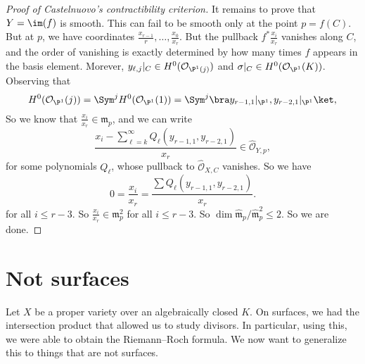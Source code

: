 \documentclass[a4paper]{article}
\begin{document}
\begin{proof}[Proof of Castelnuovo's contractibility criterion]
  It remains to prove that $Y = \im (f)$ is smooth. This can fail to be smooth only at the point $p = f(C)$. But at $p$, we have coordinates $\frac{x_{r - 1}}{r}, \ldots, \frac{x_0}{x_r}$. But the pullback $f^* \frac{x_i}{x_r}$ vanishes along $C$, and the order of vanishing is exactly determined by how many times $f$ appears in the basis element. Morever, $y_{\ell, j}|_C \in H^0(\mathcal{O}_{\P^1(j)})$ and $\sigma|_C \in H^0(\mathcal{O}_{\P^1}(K))$. Observing that
  \[
    H^0(\mathcal{O}_{\P^1}(j)) = \Sym^j H^0(\mathcal{O}_{\P^1}(1)) = \Sym^j \bra y_{r - 1, 1}|_{\P^1}, y_{r - 2, 1}|_{\P^1} \ket,
  \]
  So we know that $\frac{x_i}{x_r} \in \mathfrak{m}_p$, and we can write
  \[
    \frac{x_i - \sum^\infty_{\ell = k} Q_\ell(y_{r - 1, 1}, y_{r - 2, 1})}{x_r} \in \hat{\mathcal{O}}_{Y, p}, %
  \]
  for some polynomials $Q_{\ell}$, whose pullback to $\hat{\mathcal{O}}_{X, C}$ vanishes. So we have
  \[
    0 = \frac{x_i}{x_r} = \frac{\sum Q_\ell(y_{r - 1, 1}, y_{r - 2, 1})}{x_r}.
  \]
  for all $i \leq r - 3$. So $\frac{x_i}{x_r} \in \mathfrak{m}_p^2$ for all $i \leq r - 3$. So $\dim \hat{\mathfrak{m}}_p/\hat{\mathfrak{m}}_p^2 \leq 2$. So we are done.
\end{proof}

\section{Not surfaces}
Let $X$ be a proper variety over an algebraically closed $K$. On surfaces, we had the intersection product that allowed us to study divisors. In particular, using this, we were able to obtain the Riemann--Roch formula. We now want to generalize this to things that are not surfaces.
\end{document}
